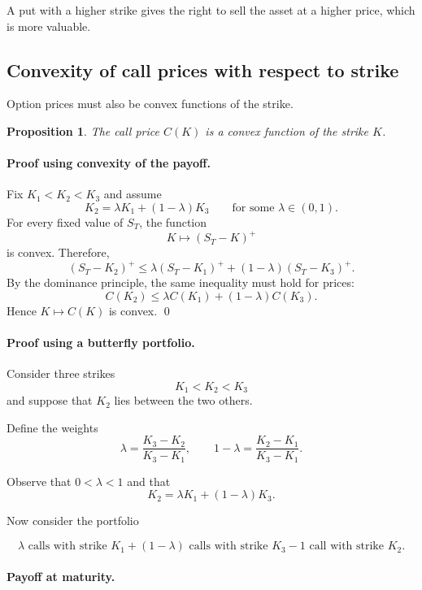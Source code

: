 \documentclass[11pt]{article}
\newcommand{\1}{\mathbf{1}}
\theoremstyle{plain}
\newtheorem{proposition}[theorem]{Proposition}
\theoremstyle{definition}
\theoremstyle{remark}
\begin{document}
A put with a higher strike gives the right to sell the asset at a higher
price, which is more valuable.

\subsection{Convexity of call prices with respect to strike}

Option prices must also be convex functions of the strike.

\begin{proposition}
The call price \(C(K)\) is a convex function of the strike \(K\).
\end{proposition}

\paragraph{Proof using convexity of the payoff.}
Fix \(K_1<K_2<K_3\) and assume
\[
K_2=\lambda K_1+(1-\lambda)K_3
\qquad\text{for some } \lambda\in(0,1).
\]
For every fixed value of \(S_T\), the function
\[
K\mapsto (S_T-K)^+
\]
is convex. Therefore,
\[
(S_T-K_2)^+
\le
\lambda (S_T-K_1)^+
+
(1-\lambda)(S_T-K_3)^+.
\]
By the dominance principle, the same inequality must hold for prices:
\[
C(K_2)
\le
\lambda C(K_1)+(1-\lambda)C(K_3).
\]
Hence \(K\mapsto C(K)\) is convex.
\qed

\paragraph{Proof using a butterfly portfolio.}

Consider three strikes
\[
K_1 < K_2 < K_3
\]
and suppose that \(K_2\) lies between the two others.

Define the weights
\[
\lambda=\frac{K_3-K_2}{K_3-K_1},
\qquad
1-\lambda=\frac{K_2-K_1}{K_3-K_1}.
\]

Observe that \(0<\lambda<1\) and that
\[
K_2=\lambda K_1+(1-\lambda)K_3.
\]

Now consider the portfolio

\[
\lambda \text{ calls with strike } K_1
+
(1-\lambda) \text{ calls with strike } K_3
-
1 \text{ call with strike } K_2 .
\]

\paragraph{Payoff at maturity.}
\end{document}
